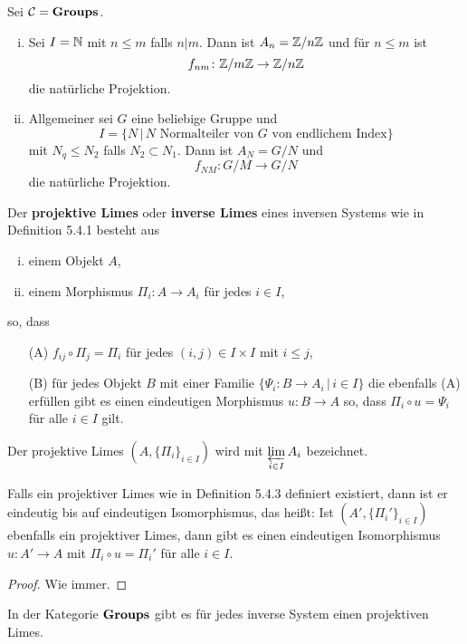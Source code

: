 \begin{Bsp}
Sei $\mathcal{C}=\textbf{\text{{Groups}}}$.
\begin{enumerate}[(i)]
\item Sei $I=\mathbb{N}$ mit  $n\leq m$ falls $n |m$. Dann ist
$A_n = \mathbb{Z} / n\mathbb{Z}$ und für $n \leq m$ ist
\[ f_{nm} \colon \mathbb{Z} / m\mathbb{Z} \to \mathbb{Z} / n\mathbb{Z}
\]
die natürliche Projektion.
\item Allgemeiner sei $G$ eine beliebige Gruppe und
\[I = \{ N \, | \, N \text{ Normalteiler von } G \text{ von endlichem Index}   \}
\]
mit $N_q \leq N_2$ falls $N_2 \subset N_1$. Dann ist $A_N = G /N$ und
\[ f_{NM} \colon G/M \to G/N
\]
die natürliche Projektion.
\end{enumerate}
\end{Bsp}

\begin{defi}
Der \textbf{projektive Limes} oder \textbf{inverse Limes} eines inversen Systems wie in Definition 5.4.1 besteht aus
\begin{enumerate}[(i)]
\item einem Objekt $A$,
\item einem Morphismus $\Pi_i \colon A \to A_i$ für jedes $i \in I$,
\end{enumerate}
so, dass
\begin{itemize}
\item[(A)] $f_{ij} \circ \Pi_j = \Pi_i$ für jedes $(i,j) \in I \times I$ mit $i \leq j$,
\item[(B)] für jedes Objekt $B$ mit einer Familie $\{ \Psi_i \colon B \to A_i \,|\,i\in I \}$ die ebenfalls (A) erfüllen gibt es einen eindeutigen Morphismus $u\colon B \to A$ so, dass $\Pi_i \circ u = \Psi_i$ für alle $i \in I$ gilt.
\end{itemize}
Der projektive Limes $(A, \{\Pi_i \}_{i\in I})$ wird mit $\varprojlim\limits_{i\in I} A_i$ bezeichnet.
\end{defi}

\begin{Bem}
Falls ein projektiver Limes wie in Definition 5.4.3 definiert existiert, dann ist er eindeutig bis auf eindeutigen Isomorphismus, das heißt:
Ist $(A', \{\Pi_i' \}_{i\in I})$  ebenfalls ein projektiver Limes, dann gibt es einen eindeutigen Isomorphismus $u\colon A' \to A$ mit $\Pi_i\circ u = \Pi_i'$ für alle $i \in I$.
\end{Bem}

\begin{proof}
Wie immer.
\end{proof}

\begin{Prop}
In der Kategorie $\textbf{\text{{Groups}}}$ gibt es für jedes inverse System einen projektiven Limes.
\end{Prop}

